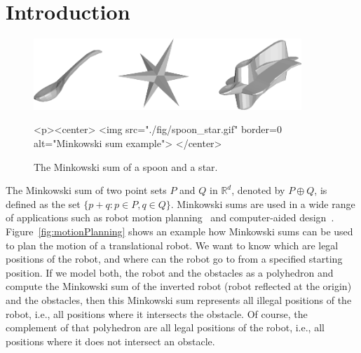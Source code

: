
\ccParDims


%

\section{Introduction}

\begin{figure}[h]
  \begin{ccTexOnly}
    \begin{center}
      \includegraphics[width=0.9\textwidth]{Minkowski_sum_3/fig/spoon_star}
    \end{center}
  \end{ccTexOnly}
  \begin{ccHtmlOnly}
    <p><center>
    <img src="./fig/spoon_star.gif" border=0 alt="Minkowski sum example">
    </center>
  \end{ccHtmlOnly}
  \caption{The Minkowski sum of a spoon and a star.}
  \label{fig:spoonStar}
\end{figure}

The Minkowski sum of two point sets $P$ and $Q$ in $\mathbb{R}^d$, denoted by
$P \oplus Q$, is defined as the set $\{p+q:p \in P, q \in Q
\}$. Minkowski sums are used in a wide range of applications such as
robot motion planning~\cite{l-rmp-91} and computer-aided
design~\cite{cgal:ek-sicad-99}. Figure~\ref{fig:motionPlanning} shows an
example how Minkowski sums can be used to plan the motion of a
translational robot. We want to know which are legal positions of the
robot, and where can the robot go to from a specified starting
position. If we model both, the robot and the obstacles as a
polyhedron and compute the Minkowski sum of the inverted robot (robot
reflected at the origin) and the obstacles, then this Minkowski sum
represents all illegal positions of the robot, i.e., all positions
where it intersects the obstacle. Of course, the complement of that
polyhedron are all legal positions of the robot, i.e., all positions
where it does not intersect an obstacle.


